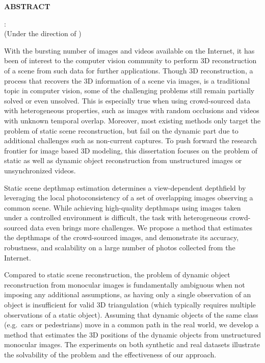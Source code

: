 
\begin{center}
\vspace*{46pt}
\textbf{ABSTRACT}
\vspace{4pt}

\begin{singlespace}
\thesisauthor: \thesistitle \\
(Under the direction of \thesisadvisors)
\vspace{10pt}
\end{singlespace}
\end{center}

With the bursting number of images and videos available on the Internet, it has been of interest to the computer vision community to perform 3D reconstruction of a scene from such data for further applications. Though 3D reconstruction, a process that recovers the 3D information of a scene via images, is a traditional topic in computer vision, some of the challenging problems still remain partially solved or even unsolved. This is especially true when using crowd-sourced data with heterogeneous properties, such as images with random occlusions and videos with unknown temporal overlap. Moreover, most existing methods only target the problem of static scene reconstruction, but fail on the dynamic part due to additional challenges such as non-current captures. To push forward the research frontier for image based 3D modeling, this dissertation focuses on the problem of static as well as dynamic object reconstruction from unstructured images or unsynchronized videos. 

Static scene depthmap estimation determines a view-dependent depthfield by leveraging
the local photoconsistency of a set of overlapping images observing a common scene. 
While achieving high-quality depthmaps using images taken under a controlled environment is difficult, the task with heterogeneous crowd-sourced data even brings more challenges. 
We propose a method that estimates the depthmaps of the crowd-sourced images, and demonstrate its accuracy, robustness, and scalability on a large number of photos collected from the Internet.
 
Compared to static scene reconstruction, the problem of dynamic object reconstruction from monocular images is fundamentally ambiguous when not imposing any additional assumptions, as having only a single observation of an object is insufficient for valid 3D triangulation (which typically requires multiple observations of a static object).  
Assuming that dynamic objects of the same class (e.g.~cars or pedestrians) move in a common path in the real world, we develop a method that estimates the 3D positions of the dynamic objects from unstructured monocular images. The experiments on both synthetic and real datasets illustrate the solvability of the problem and the effectiveness of our approach.

